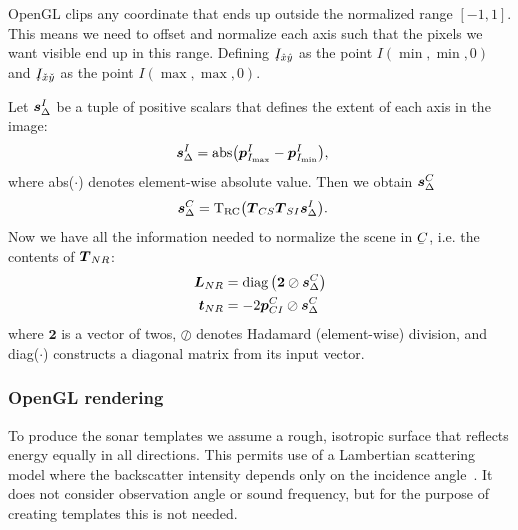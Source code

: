 OpenGL clips any coordinate that ends up outside the normalized range $[-1,1]$. This means we need to offset and normalize each axis such that the pixels we want visible end up in this range.
Defining $\udot{I}_{\hat{x}\hat{y}}$ as the point $I(\min,\min,0)$ and $\udot{I}_{\check{x}\check{y}}$ as the point $I(\max,\max,0)$.


Let ${\boldsymbol{s}_\Delta^I}$ be a tuple of positive scalars that defines the extent of each axis in the image:
%
\begin{align}\label{eq:M}
\dvec{s}_\Delta^I &= \mathrm{abs}\big(\dvec{p}_{I_\mathrm{max}}^I-\dvec{p}_{I_\mathrm{min}}^I\big),
\end{align}
%
where abs($\cdot$) denotes element-wise absolute value. Then we obtain $\boldsymbol{s}_\Delta^C$
\begin{align}\label{eq:M}
\dvec{s}_\Delta^C &= \mathrm{T_{RC}}\big(\mat{T}_{CS}\mat{T}_{SI}\dvec{s}_\Delta^I\big).
\end{align}
%
Now we have all the information needed to normalize the scene in $\ubar{C}$, i.e. the contents of $\boldsymbol{T}_{NR}$:
%
\begin{align}
\mat{L}_{NR}
&= \diag\left(\boldsymbol{2}\oslash\dvec{s}_\Delta^C\right) \label{eq_L_NR} \\
\dvec{t}_{NR}
&= -2\dvec{p}_{CI}^C\oslash\dvec{s}_\Delta^C \label{eq_t_NR}
\end{align}
%
where $\boldsymbol{2}$ is a vector of twos, $\oslash$ denotes Hadamard (element-wise) division, and diag($\cdot$) constructs a diagonal matrix from its input vector. 



\subsubsection{OpenGL rendering}

To produce the sonar templates we assume a rough, isotropic surface that reflects energy equally in all directions. This permits use of a Lambertian scattering model where the backscatter intensity depends only on the incidence angle~\cite{Zhang1999}. It does not consider observation angle or sound frequency, but for the purpose of creating templates this is not needed.   

